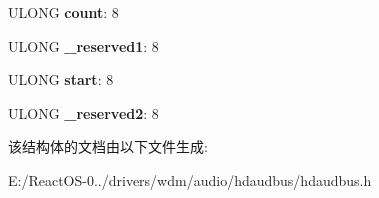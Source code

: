 \begin{DoxyCompactItemize}
U\+L\+O\+NG {\bfseries count}\+: 8
\item 
\mbox{\label{struct_c_o_d_e_c___r_e_s_p_o_n_s_e_a2723e8a7f222caae6408ed5d45c09e49}} 
U\+L\+O\+NG {\bfseries \+\_\+reserved1}\+: 8
\item 
\mbox{\label{struct_c_o_d_e_c___r_e_s_p_o_n_s_e_aca3aac3bbcd6b80407e560e82b9a1efb}} 
U\+L\+O\+NG {\bfseries start}\+: 8
\item 
\mbox{\label{struct_c_o_d_e_c___r_e_s_p_o_n_s_e_a9381f971ad0b0e60b20858e07826c14f}} 
U\+L\+O\+NG {\bfseries \+\_\+reserved2}\+: 8
\end{DoxyCompactItemize}


该结构体的文档由以下文件生成\+:\begin{DoxyCompactItemize}
\item 
E\+:/\+React\+O\+S-\/0../drivers/wdm/audio/hdaudbus/hdaudbus.\+h\end{DoxyCompactItemize}
